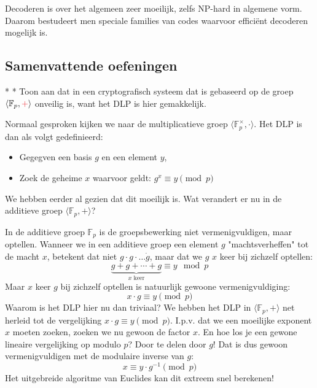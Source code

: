 Decoderen is over het algemeen zeer moeilijk, zelfs NP-hard in algemene vorm. Daarom bestudeert men speciale families van codes waarvoor efficiënt decoderen mogelijk is.


\subsection{Samenvattende oefeningen}

\begin{niceexercise}*\label{ex:l8_groep-DLP-easy}
    \nextpart[]*
    Toon aan dat in een cryptografisch systeem dat is gebaseerd op de groep $\langle \mathbb{F}_p, \textcolor{Red}{+}\rangle$ onveilig is, want het DLP is hier gemakkelijk.
\end{niceexercise}

Normaal gesproken kijken we naar de multiplicatieve groep $\langle \mathbb{F}_p^\times, \cdot \rangle$. Het DLP is dan als volgt gedefinieerd:
\begin{itemize}
    \item Gegegven een basis $g$ en een element $y$,
    \item[$\to$] Zoek de geheime $x$ waarvoor geldt: $g^x \equiv y \pmod p$
\end{itemize}
We hebben eerder al gezien dat dit moeilijk is. Wat verandert er nu in de additieve groep $\langle \mathbb{F}_p, + \rangle$?

In de additieve groep $\mathbb{F}_p$ is de groepsbewerking niet vermenigvuldigen, maar optellen. Wanneer we in een additieve groep een element $g$ "machtsverheffen" tot de macht $x$, betekent dat niet $g \cdot g \cdot \dots \dot g$, maar dat we $g$ $x$ keer bij zichzelf optellen:
\begin{equation*}
    \underbrace{g + g + \cdots + g}_{x \text{ keer}} \equiv y \mod p
\end{equation*}
Maar $x$ keer $g$ bij zichzelf optellen is natuurlijk gewoone vermenigvuldiging:
\begin{equation*}
    x \cdot g \equiv y \pmod p
\end{equation*}
Waarom is het DLP hier nu dan triviaal? We hebben het DLP in $\langle \mathbb{F}_p, + \rangle$ net herleid tot de vergelijking $x \cdot g \equiv y \pmod p$. I.p.v. dat we een moeilijke exponent $x$ moeten zoeken, zoeken we nu gewoon de factor $x$. En hoe los je een gewone lineaire vergelijking op modulo $p$?
Door te delen door $g$! Dat is dus gewoon vermenigvuldigen met de modulaire inverse van $g$:
\begin{equation*}
    x \equiv y \cdot g^{-1} \pmod p
\end{equation*}
Het uitgebreide algoritme van Euclides kan dit extreem snel berekenen!

